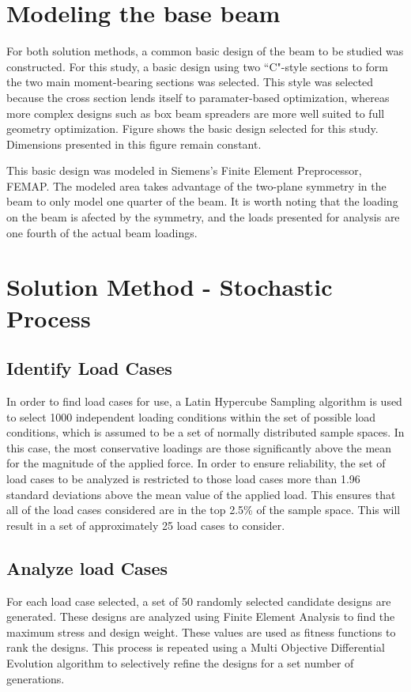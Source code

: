 \section{Modeling the base beam}
For both solution methods, a common basic design of the beam to be studied was constructed. For this study, a basic design using two ``C"-style sections to form the two main moment-bearing sections was selected. This style was selected because the cross section lends itself to paramater-based optimization, whereas more complex designs such as box beam spreaders are more well suited to full geometry optimization.  Figure  shows the basic design selected for this study. Dimensions presented in this figure remain constant. 

This basic design was modeled in Siemens's Finite Element Preprocessor, FEMAP. The modeled area takes advantage of the two-plane symmetry in the beam to only model one quarter of the beam. It is worth noting that the loading on the beam is afected by the symmetry, and the loads presented for analysis are one fourth of the actual beam loadings. 

\section{Solution Method - Stochastic Process}
\subsection{Identify Load Cases}
In order to find load cases for use, a Latin Hypercube Sampling algorithm is used to select 1000 independent loading conditions within the set of possible load conditions, which is assumed to be a set of normally distributed sample spaces. In this case, the most conservative loadings are those significantly above the mean for the magnitude of the applied force. In order to ensure reliability, the set of load cases to be analyzed is restricted to those load cases more than 1.96 standard deviations above the mean value of the applied load. This ensures that all of the load cases considered are in the top 2.5\% of the sample space. This will result in a set of approximately 25 load cases to consider. 
\subsection{Analyze load Cases} 
For each load case selected, a set of 50 randomly selected candidate designs are generated. These designs are analyzed using Finite Element Analysis to find the maximum stress and design weight. These values are used as fitness functions to rank the designs. This process is repeated using a Multi Objective Differential Evolution algorithm to selectively refine the designs for a set number of generations. 
